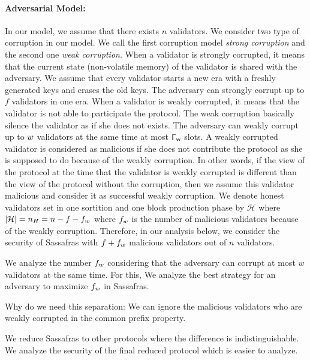 \paragraph{Adversarial Model:} In our model, we assume that there exists $ n $ validators.  We consider two type of corruption in our model. We call the first corruption model \emph{strong corruption} and the second one \emph{weak corruption}. When a validator is strongly corrupted, it means that the current state (non-volatile memory) of the validator is shared with the adversary. We assume that every validator starts a new era with a freshly generated keys and erases the old keys. The adversary can strongly corrupt up to $ f $ validators in one era.  
When a validator is weakly corrupted, it means that the validator is not able to participate the protocol. The weak corruption basically silence the validator as if she does not exists. The adversary can weakly corrupt up to $ w $ validators at the same time at most  $ \mathsf{\Gamma_{w}} $ slots. A weakly corrupted validator is considered as malicious if she does not contribute the protocol as she is supposed to do because of the weakly corruption.  In other words, if the view of the protocol at the time that the validator is weakly corrupted is different than the view of the protocol without the corruption, then we assume this validator malicious and consider it as successful weakly corruption.  We denote honest validators set in one sortition and one block production phase by $ \mathcal{H} $ where $ |\mathcal{H}| = n_H = n-f - f_{w}$ where $ f_{w} $ is the number of malicious validators because of the weakly corruption.  Therefore, in our analysis below, we consider the security of Sassafras with $ f + f_{w}$ malicious validators out of $ n $ validators. 

We analyze the number $ f_{w} $ considering that the adversary can corrupt at most $ w $ validators at the same time. For this, We analyze the best strategy for an adversary to maximize $ f_{w} $ in Sassafras.


Why do we need this separation: We can ignore the malicious validators who are weakly corrupted in the common prefix property.




We reduce Sassafras to other protocols where the difference is indistinguishable. We analyze the security of the final reduced protocol which is easier to analyze.


